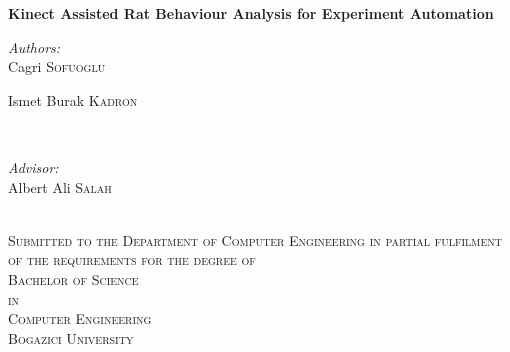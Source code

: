 \begin{titlepage}

\newcommand{\HRule}{\rule{\linewidth}{0.5mm}} %

\center %
 





{ \huge \bfseries Kinect Assisted Rat Behaviour Analysis for Experiment Automation}\\[2.5cm] %


 

\begin{minipage}{0.4\textwidth}
\begin{flushleft} \large
\emph{Authors:}\\
Cagri \textsc{Sofuoglu} %
\end{flushleft}
\begin{flushleft} \large
Ismet Burak \textsc{Kadron} %
\end{flushleft}
\end{minipage}
~
\begin{minipage}{0.4\textwidth}
\begin{flushright} \large
\emph{Advisor:} \\
Albert Ali \textsc{Salah} %
\end{flushright}
\end{minipage}\\[4cm]


\textsc{\large Submitted to the Department of Computer Engineering in partial fulfilment of the requirements for the degree of}\\[0.5cm]
\textsc{\large Bachelor of Science}\\[0.5cm]
\textsc{\large in}\\[0.5cm]
\textsc{\large Computer Engineering}\\[0.5cm] %
\textsc{\LARGE Bogazici University}\\[1.5cm] %


\end{titlepage}
